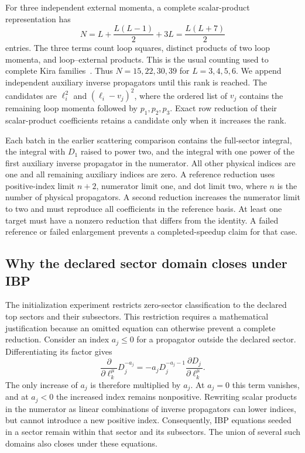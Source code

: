 For three independent external momenta, a complete scalar-product representation has
\begin{equation}
 N=L+\frac{L(L-1)}2+3L=\frac{L(L+7)}2
 \label{eq:higher-count}
\end{equation}
entries. The three terms count loop squares, distinct products of two loop momenta, and loop--external products. This is the usual counting used to complete Kira families~\cite{Kira3}. Thus $N=15,22,30,39$ for $L=3,4,5,6$. We append independent auxiliary inverse propagators until this rank is reached. The candidates are $\ell_i^2$ and $(\ell_i-v_j)^2$, where the ordered list of $v_j$ contains the remaining loop momenta followed by $p_1,p_2,p_3$. Exact row reduction of their scalar-product coefficients retains a candidate only when it increases the rank.

Each batch in the earlier scattering comparison contains the full-sector integral, the integral with $D_1$ raised to power two, and the integral with one power of the first auxiliary inverse propagator in the numerator. All other physical indices are one and all remaining auxiliary indices are zero. A reference reduction uses positive-index limit $n+2$, numerator limit one, and dot limit two, where $n$ is the number of physical propagators. A second reduction increases the numerator limit to two and must reproduce all coefficients in the reference basis. At least one target must have a nonzero reduction that differs from the identity. A failed reference or failed enlargement prevents a completed-speedup claim for that case.

\subsection{Why the declared sector domain closes under IBP}
The initialization experiment restricts zero-sector classification to the declared top sectors and their subsectors. This restriction requires a mathematical justification because an omitted equation can otherwise prevent a complete reduction. Consider an index $a_j\leq0$ for a propagator outside the declared sector. Differentiating its factor gives
\begin{equation}
 \frac{\partial}{\partial\ell_k^\mu}D_j^{-a_j}
 =-a_jD_j^{-a_j-1}\frac{\partial D_j}{\partial\ell_k^\mu}.
 \label{eq:higher-closure}
\end{equation}
The only increase of $a_j$ is therefore multiplied by $a_j$. At $a_j=0$ this term vanishes, and at $a_j<0$ the increased index remains nonpositive. Rewriting scalar products in the numerator as linear combinations of inverse propagators can lower indices, but cannot introduce a new positive index. Consequently, IBP equations seeded in a sector remain within that sector and its subsectors. The union of several such domains also closes under these equations.

